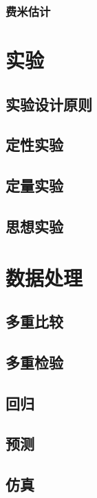 \documentclass[]{book}
\begin{document}
\subsection{费米估计}

\chapter{实验}

\section{实验设计原则}

\section{定性实验}

\section{定量实验}

\section{思想实验}

\chapter{数据处理}

\section{多重比较}

\section{多重检验}

\section{回归}

\section{预测}

\section{仿真}
\end{document}
